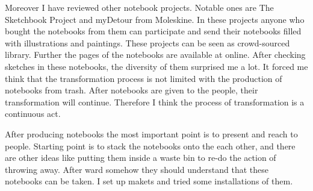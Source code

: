 {%




Moreover I have reviewed other notebook projects. Notable ones are The Sketchbook Project and myDetour from Moleskine. In these projects anyone who bought the notebooks from them can participate and send their notebooks filled with illustrations and paintings. These projects can be seen as crowd-sourced library. Further the pages of the notebooks are available at online. After checking sketches in these notebooks, the diversity of them surprised me a lot. It forced me think that the transformation process is not limited with the production of notebooks from trash. After notebooks are given to the people, their transformation will continue. Therefore I think the process of transformation is a continuous act.





After producing notebooks the most important point is to present and reach to people. Starting point is to stack the notebooks onto the each other, and there are other ideas like putting them inside a waste bin to re-do the action of throwing away. After ward somehow they should understand that these notebooks can be taken. I set up makets and tried some installations of them.

}
